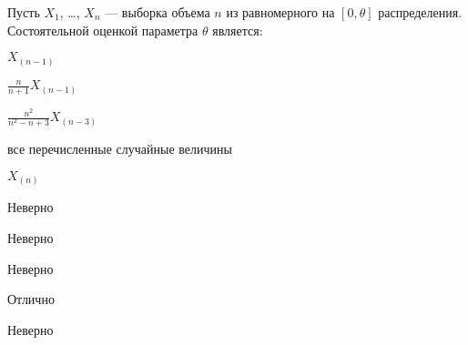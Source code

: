 
\begin{question}
Пусть \(X_1\), \ldots, \(X_n\) --- выборка объема \(n\) из равномерного
на \([0, \theta]\) распределения. Состоятельной оценкой параметра
\(\theta\) является:
\begin{answerlist}
  \item \(X_(n-1)\)
  \item \(\frac{n}{n+1} X_{(n-1)}\)
  \item \(\frac{n^2}{n^2-n+3} X_{(n-3)}\)
  \item все перечисленные случайные величины
  \item \(X_(n)\)
\end{answerlist}
\end{question}

\begin{solution}
\begin{answerlist}
  \item Неверно
  \item Неверно
  \item Неверно
  \item Отлично
  \item Неверно
\end{answerlist}
\end{solution}

